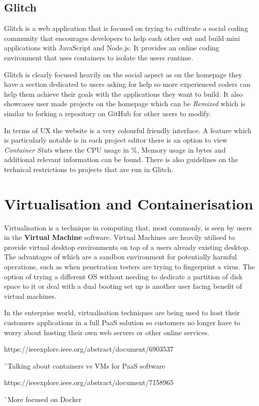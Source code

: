 \subsection{Glitch}
Glitch is a web application that is focused on trying to cultivate a social coding community that encourages developers to help each other out and build mini applications with JavaScript and Node.js. It provides an online coding environment that uses containers to isolate the users runtime.

Glitch is clearly focused heavily on the social aspect as on the homepage they have a section dedicated to users asking for help so more experienced coders can help them achieve their goals with the applications they want to build. It also showcases user made projects on the homepage which can be \textit{Remixed} which is similar to forking a repository on GitHub for other users to modify.

In terms of UX the website is a very colourful friendly interface. A feature which is particularly notable is in each project editor there is an option to view \textit{Container Stats} where the CPU usage in \%, Memory usage in bytes and additional relevant information can be found. There is also guidelines on the technical restrictions to projects that are run in Glitch. 

\section{Virtualisation and Containerisation} \label{lit-containers}

Virtualisation is a technique in computing that, most commonly, is seen by users in the \textbf{Virtual Machine} software. Virtual Machines are heavily utilised to provide virtual desktop environments on top of a users already existing desktop. The advantages of which are a sandbox environment for potentially harmful operations, such as when penetration testers are trying to fingerprint a virus. The option of trying a different OS without needing to dedicate a partition of disk space to it or deal with a dual booting set up is another user facing benefit of virtual machines.

In the enterprise world, virtualisation techniques are being used to host their customers applications in a full PaaS solution so customers no longer have to worry about hosting their own web servers or other online services.

https://ieeexplore.ieee.org/abstract/document/6903537

^^ Talking about containers vs VMs for PaaS software

https://ieeexplore.ieee.org/abstract/document/7158965

^^ More focused on Docker

\pagebreak
